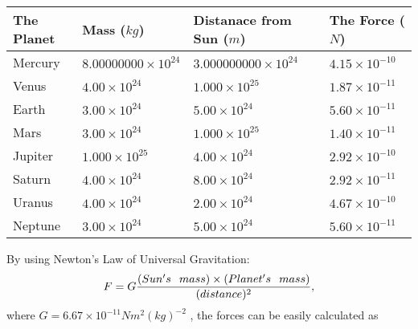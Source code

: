 \documentclass[12pt]{article}
\begin{document}
 
\begin{tabular}{|l|l|l|l|}
\hline
The Planet & Mass ($kg$) & Distanace from Sun ($m$) & The Force ($N$)\\
\hline
Mercury  &
           $ %
8.00000000 \times 10^{24} $   &
             $ %
3.000000000 \times 10^{24} $    & $ %
4.15 \times 10^{-10} $
\\  \hline
Venus    &
           $  %
4.00 \times 10^{24}  $     &
             $ %
1.000 \times 10^{25} $    & $ %
1.87 \times 10^{-11} $
\\  \hline
Earth    &
           $  %
3.00 \times 10^{24}  $     &
             $ %
5.00 \times 10^{24} $    & $ %
5.60 \times 10^{-11} $
\\   \hline
Mars     &
           $  %
3.00 \times 10^{24} $     &
             $ %
1.000 \times 10^{25} $    & $ %
1.40 \times 10^{-11} $
\\   \hline
Jupiter  &
           $  %
1.000 \times 10^{25} $    &
             $ %
4.00 \times 10^{24} $    & $ %
2.92 \times 10^{-10} $
\\  \hline
Saturn   &
           $  %
4.00 \times 10^{24} $    &
             $ %
8.00 \times 10^{24}  $    & $ %
2.92 \times 10^{-11} $
\\  \hline
Uranus   &
           $  %
4.00 \times 10^{24} $    &
             $ %
2.00 \times 10^{24} $    & $ %
4.67 \times 10^{-10} $
\\  \hline
Neptune  &
           $  %
3.00 \times 10^{24} $    &
             $ %
5.00 \times 10^{24} $    & $ %
5.60 \times 10^{-11} $
\\  \hline
 
\end{tabular}
 
 
 
 
\noindent{}
 
 

 
 
 
 
\noindent{}
 
 

By using Newton's Law of Universal Gravitation:
\[
F=G \frac{(Sun's \hspace{0.1in} mass) \times (Planet's \hspace{0.1in} mass)} { (distance)^2},
\]
where
$ G= %
6.67 \times 10^{-11} N m^{2}(kg)^{-2}$ , the forces can be easily calculated as
 
\end{document}
